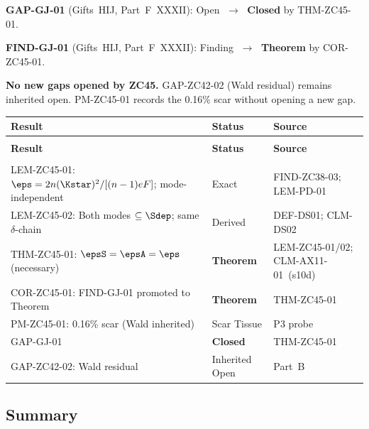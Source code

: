 \documentclass[12pt, a4paper]{article}
\begin{document}

\begin{keybox}[title={Closures and Promotions}]
\textbf{GAP-GJ-01} (Gifts~HIJ, Part~F~XXXII):
Open $\;\to\;$ \textbf{Closed} by THM-ZC45-01.

\textbf{FIND-GJ-01} (Gifts~HIJ, Part~F~XXXII):
Finding $\;\to\;$ \textbf{Theorem} by COR-ZC45-01.

\textbf{No new gaps opened by ZC45.}
GAP-ZC42-02 (Wald residual) remains inherited open.
PM-ZC45-01 records the 0.16\% scar without opening
a new gap.
\end{keybox}

\bigskip

{\small
\setlength{\LTpre}{4pt}\setlength{\LTpost}{4pt}
\renewcommand{\arraystretch}{1.30}
\begin{longtable}{>{\raggedright\arraybackslash}p{5.6cm}
                  >{\centering\arraybackslash}p{2.6cm}
                  >{\raggedright\arraybackslash}p{4.0cm}}
\toprule
\textbf{Result} & \textbf{Status} & \textbf{Source}\\
\midrule
\endfirsthead
\multicolumn{3}{l}{\small\textit{(continued)}}\\[4pt]
\toprule
\textbf{Result} & \textbf{Status} & \textbf{Source}\\
\midrule
\endhead
\midrule
\multicolumn{3}{r}{\small\textit{(continues)}}\\
\endfoot
\bottomrule
\endlastfoot
LEM-ZC45-01: $\eps = 2n(\Kstar)^2/[(n-1)eF]$;
  mode-independent &
  Exact & FIND-ZC38-03; LEM-PD-01\\
LEM-ZC45-02: Both modes $\subseteq \Sdep$; same
  $\delta$-chain &
  Derived & DEF-DS01; CLM-DS02\\
THM-ZC45-01: $\epsS = \epsA = \eps$ (necessary) &
  \textbf{Theorem} & LEM-ZC45-01/02;
  CLM-AX11-01~(s10d)\\
COR-ZC45-01: FIND-GJ-01 promoted to Theorem &
  \textbf{Theorem} & THM-ZC45-01\\
PM-ZC45-01: 0.16\% scar (Wald inherited) &
  Scar Tissue & P3 probe\\
GAP-GJ-01 &
  \textbf{Closed} & THM-ZC45-01\\
GAP-ZC42-02: Wald residual &
  Inherited Open & Part~B\\
\end{longtable}
}
\vspace{-\parskip}

\subsection{Summary}
\end{document}
